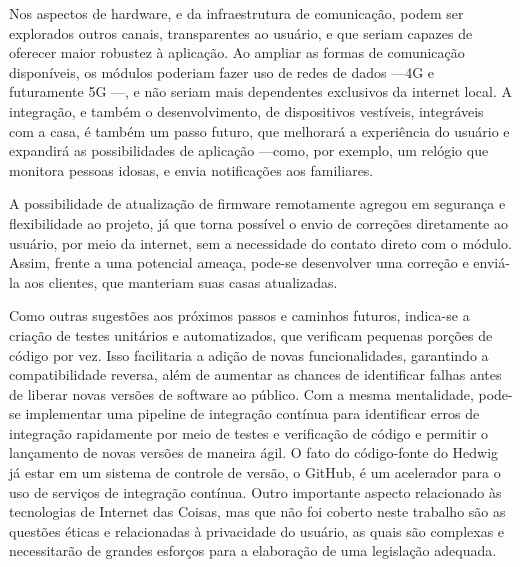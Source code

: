 Nos aspectos de hardware, e da infraestrutura de comunicação, podem ser explorados outros canais, transparentes ao usuário, e que seriam capazes de oferecer maior robustez à aplicação. Ao ampliar as formas de comunicação disponíveis, os módulos poderiam fazer uso de redes de dados ---4G e futuramente 5G ---, e não seriam mais dependentes exclusivos da internet local. A integração, e também o desenvolvimento, de dispositivos vestíveis, integráveis com a casa, é também um passo futuro, que melhorará a experiência do usuário e expandirá as possibilidades de aplicação ---como, por exemplo, um relógio que monitora pessoas idosas, e envia notificações aos familiares.

A possibilidade de atualização de firmware remotamente agregou em segurança e flexibilidade ao projeto, já que torna possível o envio de correções diretamente ao usuário, por meio da internet, sem a necessidade do contato direto com o módulo. Assim, frente a uma potencial ameaça, pode-se desenvolver uma correção e enviá-la aos clientes, que manteriam suas casas atualizadas.

Como outras sugestões aos próximos passos e caminhos futuros, indica-se a criação de testes unitários e automatizados, que verificam pequenas porções de código por vez. Isso facilitaria a adição de novas funcionalidades, garantindo a compatibilidade reversa, além de aumentar as chances de identificar falhas antes de liberar novas versões de software ao público. Com a mesma mentalidade, pode-se implementar uma pipeline de integração contínua para identificar erros de integração rapidamente por meio de testes e verificação de código e permitir o lançamento de novas versões de maneira ágil. O fato do código-fonte do Hedwig já estar em um sistema de controle de versão, o GitHub, é um acelerador para o uso de serviços de integração contínua. Outro importante aspecto relacionado às tecnologias de Internet das Coisas, mas que não foi coberto neste trabalho são as questões éticas e relacionadas à privacidade do usuário, as quais são complexas e necessitarão de grandes esforços para a elaboração de uma legislação adequada.
